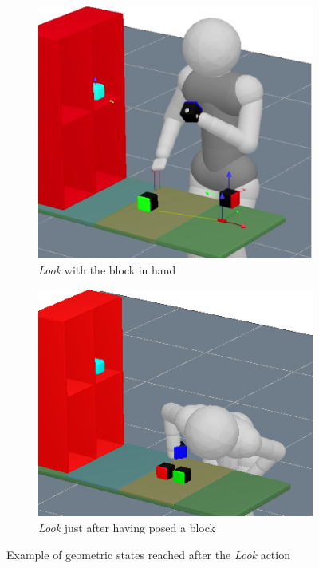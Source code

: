 \documentclass[conference]{IEEEtran}
\begin{document}
\begin{figure}
\centering
        \hfill
        \begin{subfigure}[t]{0.15\textwidth}
            \includegraphics[width=\textwidth]{images/suss-b.png}
            \caption{\textit{Look} with the block in hand}
        \label{fig:look-1}
        \end{subfigure}
        \hfill
        \begin{subfigure}[t]{0.15\textwidth}
            \includegraphics[width=\textwidth]{images/check-no-lift.png}
            \caption{\textit{Look} just after having posed a block}
            \label{fig:look-2}
        \end{subfigure}
        \hfill
        \caption{Example of geometric states reached after the \textit{Look} action}
\label{fig:checks}
\end{figure}
\end{document}
